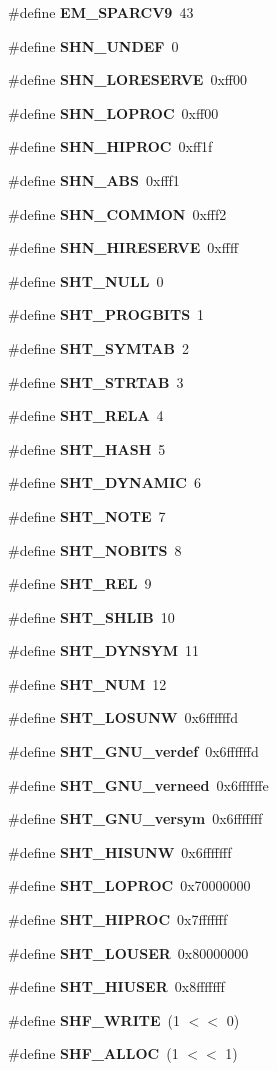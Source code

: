 \begin{CompactItemize}
\#define {\bf EM\_\-SPARCV9}~43
\item 
\#define {\bf SHN\_\-UNDEF}~0
\item 
\#define {\bf SHN\_\-LORESERVE}~0xff00
\item 
\#define {\bf SHN\_\-LOPROC}~0xff00
\item 
\#define {\bf SHN\_\-HIPROC}~0xff1f
\item 
\#define {\bf SHN\_\-ABS}~0xfff1
\item 
\#define {\bf SHN\_\-COMMON}~0xfff2
\item 
\#define {\bf SHN\_\-HIRESERVE}~0xffff
\item 
\#define {\bf SHT\_\-NULL}~0
\item 
\#define {\bf SHT\_\-PROGBITS}~1
\item 
\#define {\bf SHT\_\-SYMTAB}~2
\item 
\#define {\bf SHT\_\-STRTAB}~3
\item 
\#define {\bf SHT\_\-RELA}~4
\item 
\#define {\bf SHT\_\-HASH}~5
\item 
\#define {\bf SHT\_\-DYNAMIC}~6
\item 
\#define {\bf SHT\_\-NOTE}~7
\item 
\#define {\bf SHT\_\-NOBITS}~8
\item 
\#define {\bf SHT\_\-REL}~9
\item 
\#define {\bf SHT\_\-SHLIB}~10
\item 
\#define {\bf SHT\_\-DYNSYM}~11
\item 
\#define {\bf SHT\_\-NUM}~12
\item 
\#define {\bf SHT\_\-LOSUNW}~0x6ffffffd
\item 
\#define {\bf SHT\_\-GNU\_\-verdef}~0x6ffffffd
\item 
\#define {\bf SHT\_\-GNU\_\-verneed}~0x6ffffffe
\item 
\#define {\bf SHT\_\-GNU\_\-versym}~0x6fffffff
\item 
\#define {\bf SHT\_\-HISUNW}~0x6fffffff
\item 
\#define {\bf SHT\_\-LOPROC}~0x70000000
\item 
\#define {\bf SHT\_\-HIPROC}~0x7fffffff
\item 
\#define {\bf SHT\_\-LOUSER}~0x80000000
\item 
\#define {\bf SHT\_\-HIUSER}~0x8fffffff
\item 
\#define {\bf SHF\_\-WRITE}~(1 $<$$<$ 0)
\item 
\#define {\bf SHF\_\-ALLOC}~(1 $<$$<$ 1)
\item 

\end{CompactItemize}

